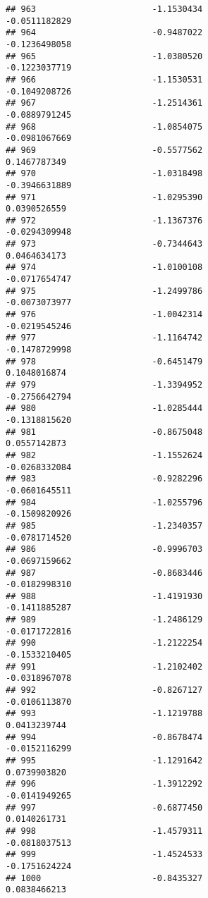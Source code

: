 \documentclass[
]{article}
\begin{document}
\begin{verbatim}
## 963                       -1.1530434                         -0.0511182829
## 964                       -0.9487022                         -0.1236498058
## 965                       -1.0380520                         -0.1223037719
## 966                       -1.1530531                         -0.1049208726
## 967                       -1.2514361                         -0.0889791245
## 968                       -1.0854075                         -0.0981067669
## 969                       -0.5577562                          0.1467787349
## 970                       -1.0318498                         -0.3946631889
## 971                       -1.0295390                          0.0390526559
## 972                       -1.1367376                         -0.0294309948
## 973                       -0.7344643                          0.0464634173
## 974                       -1.0100108                         -0.0717654747
## 975                       -1.2499786                         -0.0073073977
## 976                       -1.0042314                         -0.0219545246
## 977                       -1.1164742                         -0.1478729998
## 978                       -0.6451479                          0.1048016874
## 979                       -1.3394952                         -0.2756642794
## 980                       -1.0285444                         -0.1318815620
## 981                       -0.8675048                          0.0557142873
## 982                       -1.1552624                         -0.0268332084
## 983                       -0.9282296                         -0.0601645511
## 984                       -1.0255796                         -0.1509820926
## 985                       -1.2340357                         -0.0781714520
## 986                       -0.9996703                         -0.0697159662
## 987                       -0.8683446                         -0.0182998310
## 988                       -1.4191930                         -0.1411885287
## 989                       -1.2486129                         -0.0171722816
## 990                       -1.2122254                         -0.1533210405
## 991                       -1.2102402                         -0.0318967078
## 992                       -0.8267127                         -0.0106113870
## 993                       -1.1219788                          0.0413239744
## 994                       -0.8678474                         -0.0152116299
## 995                       -1.1291642                          0.0739903820
## 996                       -1.3912292                         -0.0141949265
## 997                       -0.6877450                          0.0140261731
## 998                       -1.4579311                         -0.0818037513
## 999                       -1.4524533                         -0.1751624224
## 1000                      -0.8435327                          0.0838466213
\end{verbatim}
\end{document}
